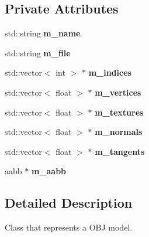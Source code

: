 \subsection*{Private Attributes}
\begin{DoxyCompactItemize}
\item 
\mbox{\label{classflounder_1_1model_af15fa0eec11d5791d04c6f569f8dfd2d}} 
std\+::string {\bfseries m\+\_\+name}
\item 
\mbox{\label{classflounder_1_1model_a176fa436cac56744160e1c2c8698a450}} 
std\+::string {\bfseries m\+\_\+file}
\item 
\mbox{\label{classflounder_1_1model_af2bd62f69d8a22d555aa25c19864c466}} 
std\+::vector$<$ int $>$ $\ast$ {\bfseries m\+\_\+indices}
\item 
\mbox{\label{classflounder_1_1model_af393e750e6079f663accbeae1302fbe2}} 
std\+::vector$<$ float $>$ $\ast$ {\bfseries m\+\_\+vertices}
\item 
\mbox{\label{classflounder_1_1model_a526a0012b1124f8aca381978a628a044}} 
std\+::vector$<$ float $>$ $\ast$ {\bfseries m\+\_\+textures}
\item 
\mbox{\label{classflounder_1_1model_ae7f461a9d7f7a0731d90db5861cfd219}} 
std\+::vector$<$ float $>$ $\ast$ {\bfseries m\+\_\+normals}
\item 
\mbox{\label{classflounder_1_1model_a22c6766cb5cdb737f37579630bbbb961}} 
std\+::vector$<$ float $>$ $\ast$ {\bfseries m\+\_\+tangents}
\item 
\mbox{\label{classflounder_1_1model_a95212f2754f856a37eb8c27aaa8dbf15}} 
aabb $\ast$ {\bfseries m\+\_\+aabb}
\end{DoxyCompactItemize}


\subsection{Detailed Description}
Class that represents a O\+BJ model. 



